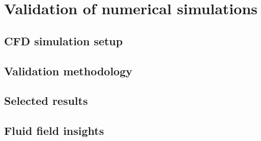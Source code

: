 \chapter{Validation of numerical simulations}
\label{cap:cfd}

\noindent

\section{CFD simulation setup} %

\section{Validation methodology} %
\section{Selected results}
\section{Fluid field insights} %